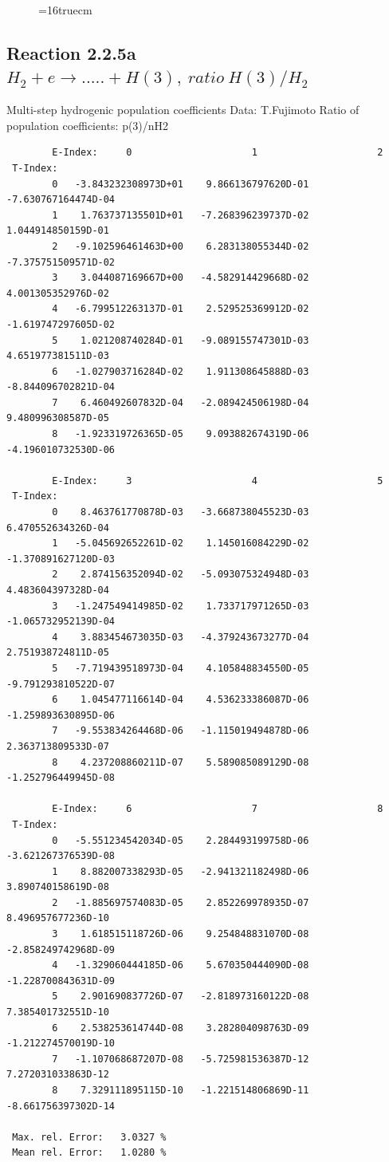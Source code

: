 \documentclass[12pt,dvips]{article}
\begin{document}
\begin{figure} \label{2.3.6lr1}
\epsfxsize=16truecm
\end{figure}
\newpage

\subsection{
Reaction 2.2.5a $ H_2 + e \rightarrow .....+ H(3), \   ratio ~ H(3)/H_2 $
}
 Multi-step hydrogenic population coefficients
 Data: T.Fujimoto
 Ratio of population coefficients: p(3)/nH2


\begin{small}\begin{verbatim}
        E-Index:     0                     1                     2
 T-Index:
        0   -3.843232308973D+01    9.866136797620D-01   -7.630767164474D-04
        1    1.763737135501D+01   -7.268396239737D-02    1.044914850159D-01
        2   -9.102596461463D+00    6.283138055344D-02   -7.375751509571D-02
        3    3.044087169667D+00   -4.582914429668D-02    4.001305352976D-02
        4   -6.799512263137D-01    2.529525369912D-02   -1.619747297605D-02
        5    1.021208740284D-01   -9.089155747301D-03    4.651977381511D-03
        6   -1.027903716284D-02    1.911308645888D-03   -8.844096702821D-04
        7    6.460492607832D-04   -2.089424506198D-04    9.480996308587D-05
        8   -1.923319726365D-05    9.093882674319D-06   -4.196010732530D-06

        E-Index:     3                     4                     5
 T-Index:
        0    8.463761770878D-03   -3.668738045523D-03    6.470552634326D-04
        1   -5.045692652261D-02    1.145016084229D-02   -1.370891627120D-03
        2    2.874156352094D-02   -5.093075324948D-03    4.483604397328D-04
        3   -1.247549414985D-02    1.733717971265D-03   -1.065732952139D-04
        4    3.883454673035D-03   -4.379243673277D-04    2.751938724811D-05
        5   -7.719439518973D-04    4.105848834550D-05   -9.791293810522D-07
        6    1.045477116614D-04    4.536233386087D-06   -1.259893630895D-06
        7   -9.553834264468D-06   -1.115019494878D-06    2.363713809533D-07
        8    4.237208860211D-07    5.589085089129D-08   -1.252796449945D-08

        E-Index:     6                     7                     8
 T-Index:
        0   -5.551234542034D-05    2.284493199758D-06   -3.621267376539D-08
        1    8.882007338293D-05   -2.941321182498D-06    3.890740158619D-08
        2   -1.885697574083D-05    2.852269978935D-07    8.496957677236D-10
        3    1.618515118726D-06    9.254848831070D-08   -2.858249742968D-09
        4   -1.329060444185D-06    5.670350444090D-08   -1.228700843631D-09
        5    2.901690837726D-07   -2.818973160122D-08    7.385401732551D-10
        6    2.538253614744D-08    3.282804098763D-09   -1.212274570019D-10
        7   -1.107068687207D-08   -5.725981536387D-12    7.272031033863D-12
        8    7.329111895115D-10   -1.221514806869D-11   -8.661756397302D-14

 Max. rel. Error:   3.0327 %
 Mean rel. Error:   1.0280 %

\end{verbatim}\end{small}
\end{document}
